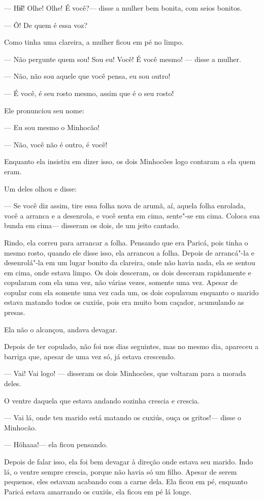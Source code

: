 --- Hɨ̃ɨ! Olhe! Olhe! É você?--- disse a mulher bem bonita, com seios
bonitos.

--- Ô! De quem é essa voz?

Como tinha uma clareira, a mulher ficou em pé no limpo. 

--- Não pergunte quem sou! Sou eu! Você! É você mesmo! --- disse a
mulher.

--- Não, não sou aquele que você pensa, eu sou outro! 

--- É você, é seu rosto mesmo, assim que é o seu rosto! 

Ele pronunciou seu nome: 

--- Eu sou mesmo o Minhocão!

--- Não, você não é outro, é você! 

Enquanto ela insistiu em dizer isso, os dois Minhocões logo contaram a ela quem eram. 

Um deles olhou e disse: 

--- Se você diz assim, tire essa folha nova de arumã, aí, aquela folha
enrolada, você a arranca e a desenrola, e você senta em cima, sente"-se
em cima. Coloca sua bunda em cima--- disseram os dois, de um jeito
cantado. 

Rindo, ela correu para arrancar a folha. Pensando que era Paricá, pois
tinha o mesmo rosto, quando ele disse isso, ela arrancou a folha. Depois
de arrancá"-la e desenrolá"-la em um lugar bonito da clareira, onde não
havia nada, ela se sentou em cima, onde estava limpo. Os dois desceram,
os dois desceram rapidamente e copularam com ela uma vez, não várias
vezes, somente uma vez. Apesar de copular com ela somente uma vez cada um, os dois copulavam enquanto o marido estava matando todos os cuxiús,
pois era muito bom caçador, acumulando as presas. 

Ela não o alcançou, andava devagar. 

Depois de ter copulado, não foi nos dias seguintes, mas no mesmo dia,
apareceu a barriga que, apesar de uma vez só, já estava crescendo. 

--- Vai! Vai logo! --- disseram os dois Minhocões, que voltaram para a
morada deles. 

O ventre daquela que estava andando sozinha crescia e crescia. 

--- Vai lá, onde teu marido está matando os cuxiús, ouça os gritos!---
disse o Minhocão. 

--- Hõhaaa!--- ela ficou pensando.

Depois de falar isso, ela foi bem devagar à direção onde estava seu
marido. Indo lá, o ventre sempre crescia, porque não havia só um filho.
Apesar de serem pequenos, eles estavam acabando com a carne dela. Ela
ficou em pé, enquanto Paricá estava amarrando os cuxiús, ela ficou em pé
lá longe. 

